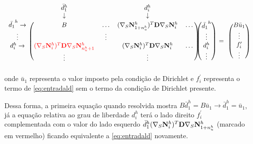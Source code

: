 \begin{equation} \label{eq:bigconst}
\begin{blockarray}{ccccc}
& \bar{d}_1^h &  & d_i ^h & & \\
& \downarrow &  & \downarrow & & \\
\begin{block}{c(cccc)}
\bar{d_1}^h \rightarrow & B & \hdots &  \kij{1+\qtdfreedomfine}{i}  & \hdots \\
\vdots                  &   & \vdots &             \\
d_i^h       \rightarrow &{ \color{red}\kij{i}{n_u^h + 1} }  &      & \kij{i}{i}   & \hdots \\
& \vdots &      & \vdots   &  \\
\end{block}
\end{blockarray} \begin{blockarray}{c}
 \\
 \\
\begin{block}{(c)}
\bar{d_1}^h \\
\vdots\\
d_i^h \\
\vdots  \\
\end{block}
\end{blockarray}\begin{blockarray}{c}
 \\
 \\
 \\
= \\
 \\
\end{blockarray} \begin{blockarray}{c}
 \\
 \\
\begin{block}{(c)}
 B \bar{u}_1 \\
\vdots\\
f^\prime_i \\
\vdots  \\
\end{block}
\end{blockarray}
\end{equation}
onde $\bar{u}_1$ representa o valor imposto pela condição de Dirichlet e $f^\prime_i$ representa o termo de \eqref{eq:entradald} sem o termo da condição de Dirichlet presente.

Dessa forma, a primeira equação quando resolvida mostra $B\bar{d}_1^h = B\bar{u}_1 \rightarrow \bar{d}_1^h = \bar{u}_1$, já a equação relativa ao grau de liberdade $d_i^h$ terá o lado direito $f^\prime_i$ complementada com o valor do lado esquerdo $\bar{d}_1^h (\nabla_S {\mathbf{N}_{i}^h})^T \mathbf{D} \nabla_S {\mathbf{N}_{1+n_u^h}^h}$ (marcado em vermelho) ficando equivalente a \eqref{eq:entradald} novamente.

